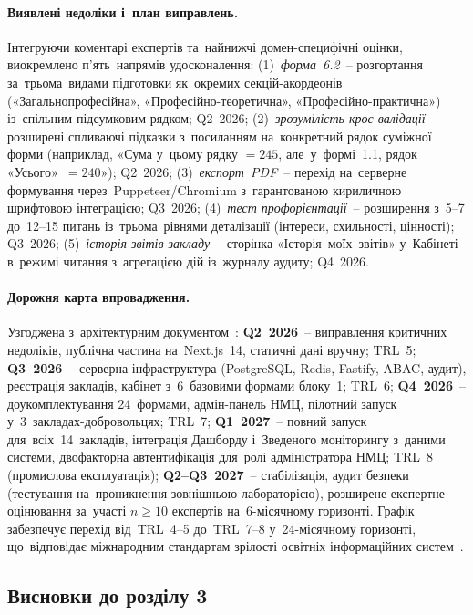 \paragraph{Виявлені недоліки і~план виправлень.} Інтегруючи коментарі експертів та~найнижчі домен-специфічні оцінки, виокремлено п'ять~напрямів удосконалення: (1)~\emph{форма~6.2}~-- розгортання за~трьома~видами підготовки як~окремих секцій-акордеонів («Загальнопрофесійна», «Професійно-теоретична», «Професійно-практична») із~спільним підсумковим рядком; Q2~2026; (2)~\emph{зрозумілість крос-валідації}~-- розширені спливаючі підказки з~посиланням на~конкретний рядок суміжної форми (наприклад, «Сума у~цьому рядку $=245$, але~у~формі~1.1, рядок «Усього»~$=240$»); Q2~2026; (3)~\emph{експорт~PDF}~-- перехід на~серверне формування через~Puppeteer/Chromium з~гарантованою кириличною шрифтовою інтеграцією; Q3~2026; (4)~\emph{тест профорієнтації}~-- розширення з~5--7 до~12--15 питань із~трьома~рівнями деталізації (інтереси, схильності, цінності); Q3~2026; (5)~\emph{історія звітів закладу}~-- сторінка «Історія~моїх~звітів» у~Кабінеті в~режимі читання з~агрегацією дій із~журналу аудиту; Q4~2026.

\paragraph{Дорожня карта впровадження.} Узгоджена з~архітектурним документом~\cite{NMTsPTO2025}: \textbf{Q2~2026}~-- виправлення критичних недоліків, публічна частина на~Next.js~14, статичні дані вручну; TRL~5; \textbf{Q3~2026}~-- серверна інфраструктура (PostgreSQL, Redis, Fastify, ABAC, аудит), реєстрація закладів, кабінет з~6~базовими формами блоку~1; TRL~6; \textbf{Q4~2026}~-- доукомплектування 24~формами, адмін-панель НМЦ, пілотний запуск у~3~закладах-добровольцях; TRL~7; \textbf{Q1~2027}~-- повний запуск для~всіх~14~закладів, інтеграція Дашборду і~Зведеного моніторингу з~даними системи, двофакторна автентифікація для~ролі адміністратора НМЦ; TRL~8 (промислова експлуатація); \textbf{Q2--Q3~2027}~-- стабілізація, аудит безпеки (тестування на~проникнення зовнішньою лабораторією), розширене експертне оцінювання за~участі $n \geq 10$ експертів на~6-місячному горизонті. Графік забезпечує перехід від~TRL~4--5 до~TRL~7--8 у~24-місячному горизонті, що~відповідає міжнародним стандартам зрілості освітніх інформаційних систем~\cite{Mustamir2024Dashboard}.

\subsection*{Висновки до розділу 3}

